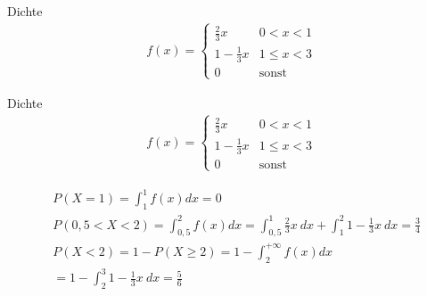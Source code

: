 \documentclass[t,11pt]{beamer}
\begin{document}
\begin{frame}
	\begin{block}{Dichte}
		\vspace{-0.5cm}
		\begin{align*}
		f(x)=\begin{cases}
		\frac{2}{3}x & 0<x<1\\
		1-\frac{1}{3}x & 1\leq x <3 \\
		0 & \text{sonst}
		\end{cases}
		\end{align*}
	\end{block}
\end{frame}

\begin{frame}
\begin{block}{Dichte}
	\vspace{-0.5cm}
	\begin{align*}
	f(x)=\begin{cases}
	\frac{2}{3}x & 0<x<1\\
	1-\frac{1}{3}x & 1\leq x <3 \\
	0 & \text{sonst}
	\end{cases}
	\end{align*}
\end{block}
\begin{align*}
&P(X=1) = \int_1^1 f(x) dx = 0 \\
&P(0,5<X<2) = \int_{0,5}^2 f(x)dx = \int_{0,5}^1 \frac{2}{3}x~dx + \int_{1}^2 1-\frac{1}{3}x~dx = \frac{3}{4} \\
&P(X<2) = 1-P(X\geq 2) = 1- \int_{2}^{+\infty}f(x)dx \\&= 1-  \int_{2}^{3}1-\frac{1}{3}x~dx = \frac{5}{6}
\end{align*}
\end{frame}
\end{document}
